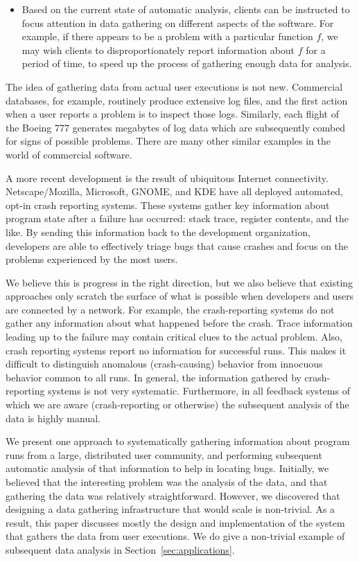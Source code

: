 \begin{itemize}
\item Based on the current state of automatic analysis, clients can be
instructed to focus attention in data gathering on different aspects
of the software.  For example, if there appears to be a problem
with a particular function $f$, we may wish clients to disproportionately
report information about $f$ for a period of time, to speed up
the process of gathering enough data for analysis.

\end{itemize}

The idea of gathering data from actual user executions is not new.
Commercial databases, for example, routinely produce extensive
log files, and the first action when a user reports a problem is
to inspect those logs.  Similarly, each flight of the Boeing 777
generates megabytes of log data which are subsequently combed
for signs of possible problems.  There are many other similar
examples in the world of commercial software.

A more recent development is the result of ubiquitous Internet
connectivity.  Netscape/Mozilla, Microsoft, GNOME, and KDE have all
deployed automated, opt-in crash reporting systems.  These systems
gather key information about program state after a failure has
occurred: stack trace, register contents, and the like.  By sending
this information back to the development organization, developers are
able to effectively triage bugs that cause crashes and focus on the
problems experienced by the most users.

We believe this is progress in the right direction, but we also
believe that existing approaches only scratch the surface of what
is possible when developers and users are connected by a network.
For example, the crash-reporting systems do not gather any information
about what happened before the crash.  Trace information
leading up to the failure may contain critical clues to the actual
problem.  Also, crash reporting systems
report no information for successful runs.  This makes it difficult to
distinguish anomalous (crash-causing) behavior from innocuous behavior
common to all runs.  In general, the information gathered by 
crash-reporting systems is not very systematic.  Furthermore, in all
feedback systems of which we are aware (crash-reporting or otherwise)
the subsequent analysis of the data is highly manual.

We present one approach to systematically gathering information
about program runs from a large, distributed user community, and
performing subsequent automatic analysis of that information to
help in locating bugs.  Initially, we believed that the interesting
problem was the analysis of the data, and that gathering the
data was relatively straightforward.  However, we discovered that
designing a data gathering infrastructure that would scale is
non-trivial.  As a result, this paper discusses mostly the design
and implementation of the system that gathers the data from user
executions. We do give a non-trivial example of subsequent data analysis
in Section~\ref{sec:applications}.

